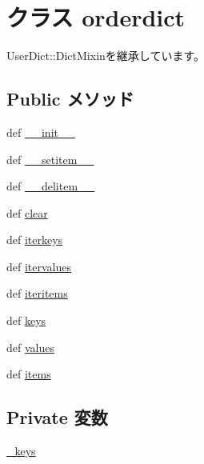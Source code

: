 \hypertarget{classm5_1_1util_1_1orderdict_1_1orderdict}{
\section{クラス orderdict}
\label{classm5_1_1util_1_1orderdict_1_1orderdict}
}


UserDict::DictMixinを継承しています。\subsection*{Public メソッド}
\begin{DoxyCompactItemize}
\item 
def \hyperlink{classm5_1_1util_1_1orderdict_1_1orderdict_ac775ee34451fdfa742b318538164070e}{\_\-\_\-init\_\-\_\-}
\item 
def \hyperlink{classm5_1_1util_1_1orderdict_1_1orderdict_a09195b01147e970ca71c48b57f653940}{\_\-\_\-setitem\_\-\_\-}
\item 
def \hyperlink{classm5_1_1util_1_1orderdict_1_1orderdict_a5fa6cfe34d7e2fe5b9c38e1d74fffac8}{\_\-\_\-delitem\_\-\_\-}
\item 
def \hyperlink{classm5_1_1util_1_1orderdict_1_1orderdict_a07b95aa63e9e2d286ef0aa83d5bb34b2}{clear}
\item 
def \hyperlink{classm5_1_1util_1_1orderdict_1_1orderdict_a44560b0b40dfcd2069b980760783cc7b}{iterkeys}
\item 
def \hyperlink{classm5_1_1util_1_1orderdict_1_1orderdict_aeb6e8630a10560ad0d4b34377c790f19}{itervalues}
\item 
def \hyperlink{classm5_1_1util_1_1orderdict_1_1orderdict_a13d39839ad1cfd4c47f524735933c0bf}{iteritems}
\item 
def \hyperlink{classm5_1_1util_1_1orderdict_1_1orderdict_aeb7ba70a3c91eced4f8d49ac5dc0c398}{keys}
\item 
def \hyperlink{classm5_1_1util_1_1orderdict_1_1orderdict_abb73a0060caeba53780d972f37623f1e}{values}
\item 
def \hyperlink{classm5_1_1util_1_1orderdict_1_1orderdict_a717291221885735d6870d7179083ec07}{items}
\end{DoxyCompactItemize}
\subsection*{Private 変数}
\begin{DoxyCompactItemize}
\item 
\hyperlink{classm5_1_1util_1_1orderdict_1_1orderdict_acfb10d1266cc09a17da517a676ee4570}{\_\-keys}
\end{DoxyCompactItemize}


